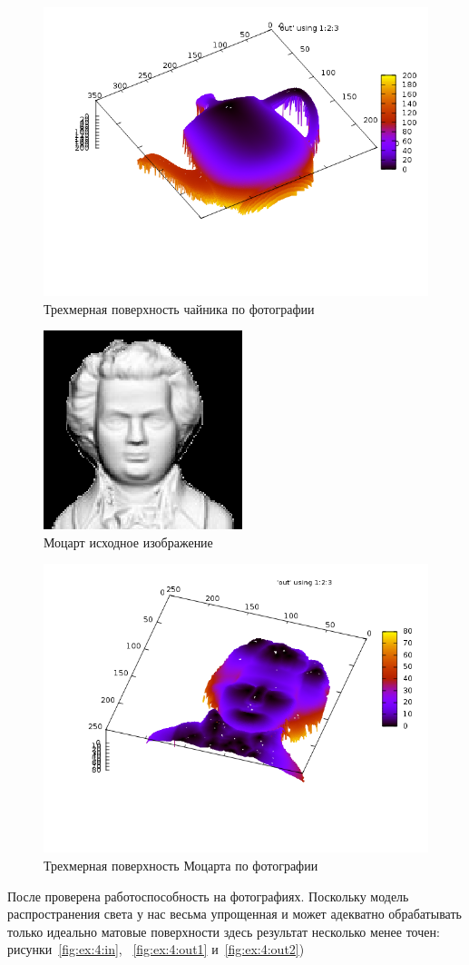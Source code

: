 \begin{figure}[H]
  \centering
  \includegraphics[width=0.5\linewidth]{img/teapot.png}
  \hfil \caption{Трехмерная поверхность чайника по фотографии}
  \label{fig:ex:2:out}
\end{figure}

\begin{figure}[H]
  \centering
  \includegraphics[width=0.5\linewidth]{img/mozart_in.png}
  \hfil \caption{Моцарт исходное изображение}
  \label{fig:ex:3:in}
\end{figure}

\begin{figure}[H]
  \centering
  \includegraphics[width=0.5\linewidth]{img/mozart.png}
  \hfil \caption{Трехмерная поверхность Моцарта по фотографии}
  \label{fig:ex:3:out}
\end{figure}

После проверена работоспособность на фотографиях. Поскольку модель
распространения света у нас весьма упрощенная и может адекватно
обрабатывать только идеально матовые поверхности здесь результат
несколько менее точен: рисунки~\ref{fig:ex:4:in}, ~\ref{fig:ex:4:out1}
и~\ref{fig:ex:4:out2})

